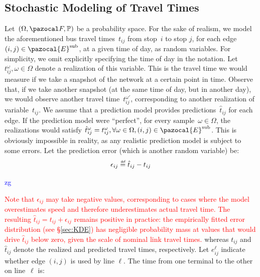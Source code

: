 \documentclass[a4paper,fleqn]{cas-sc}
\newcommand{\defeq}{\stackrel{\scalebox{0.5}{\ensuremath{\mathsf{\,def}}}}{=}}
\newcommand{\stkout}[1]{\ifmmode\text{\sout{\ensuremath{#1}}}\else\sout{#1}\fi}
\newcommand\rev[3]{\textcolor{blue}{\begin{scriptsize}{#1}\end{scriptsize}\stkout{#2}}\textcolor{red}{#3}}
\newcommand\rev[3]{\ignorespaces#3\ignorespaces\unskip}
\begin{document}
\subsection{Stochastic Modeling of Travel Times}
\label{sec:Stochastic-Modeling-of-Travel-Times}
Let~$(\Omega,\pazocal F,\mathbb P)$ be a probability space. 
For the sake of realism, we model the aforementioned bus travel times~$t_{ij}$ from stop~$i$ to stop $j$, for each edge $(i,j)\in\pazocal{E}^{\text{sub}}$, at a given time of day, as random variables. For simplicity, we omit explicitly specifying the time of day in the notation. Let~$t_{ij}^\omega, \omega\in\Omega$ denote a realization of this variable. 
%
This is the travel time we would measure if we take a snapshot of the network at a certain point in time. Observe that, if we take another snapshot (at the same time of day, but in another day), we would observe another travel time~$t_{ij}^{\omega'}$, corresponding to another realization of variable~$t_{ij}$.
We assume that a prediction model provides predictions~$\hat t_{ij}$ for each edge.
%
If the prediction model were ``perfect'', for every sample~$\omega\in\Omega$, the realizations would satisfy $\hat t_{ij}^\omega = t_{ij}^\omega, \forall \omega\in\Omega,(i,j)\in\pazocal{E}^{\text{sub}}$. This is obviously impossible in reality, as any realistic prediction model is subject to some errors. Let the prediction error (which is another random variable) be:
%
\begin{equation}
\epsilon_{ij} \defeq \hat t_{ij}-t_{ij}\label{eq:link_time_error}
\end{equation}
%
\rev{zg}{}{Note that $\epsilon_{ij}$ may take negative values, corresponding to cases where the model overestimates speed and therefore underestimates actual travel time. The resulting $\hat{t}_{ij} = t_{ij} + \epsilon_{ij}$ remains positive in practice: the empirically fitted error distribution (see \S{}\ref{sec:KDE}) has negligible probability mass at values that would drive $\hat{t}_{ij}$ below zero, given the scale of nominal link travel times.}
whereas $t_{ij}$ and $\hat t_{ij}$ denote the realized and predicted travel times, respectively. 
%
Let $e_{ij}^\ell$ indicate whether edge $(i,j)$ is used by line $\ell$. 
%
The time from one terminal to the other on line~$\ell$ is: 
\end{document}
